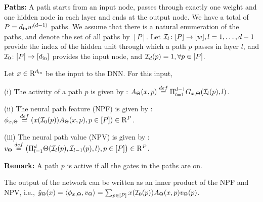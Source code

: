 \documentclass{article}
\begin{document}
\textbf{Paths:} A path starts from an input node, passes through exactly one weight and one hidden node in each layer and ends at the output node. We have a total of $P=d_{\text{in}} w^{(d-1)}$ paths. We assume that there is a natural enumeration of the paths, and denote the set of all paths by $[P]$. Let $\mathcal{I}_{l}\colon [P]\rightarrow [w],l=1,\ldots,d-1$ provide the index of the hidden unit through which a path $p$ passes in layer $l$, and $\mathcal{I}_{0}\colon [P]\rightarrow [d_{\text{in}}]$ provides the input node, and $\mathcal{I}_{d}(p)=1,\forall p\in[P]$.
\begin{definition}\label{def:nps} Let $x\in\mathrm{R}^{d_{\text{in}}}$ be the input to the DNN. For this input, 

(i) The activity of a path $p$ is given by : $A_{\Theta}(x,p)\stackrel{def}{=}\Pi_{l=1}^{d-1} G_{x,\Theta}(\mathcal{I}_l(p),l)$.

(ii) The {neural path feature} (NPF) is given by :  $\phi_{x,\Theta}\stackrel{def}=\left(x(\mathcal{I}_0(p))A_{\Theta}(x,p) ,p\in[P]\right)\in\mathrm{R}^P$. 

(iii) The {neural path value} (NPV) is given by : $v_{\Theta}\stackrel{def}=\left(\Pi_{l=1}^d \Theta(\mathcal{I}_l(p),\mathcal{I}_{l-1}(p),l),p\in[P]\right)\in\mathrm{R}^P$.
\end{definition}
\textbf{Remark:} A path $p$ is active if all the gates in the paths are on.
\begin{proposition}\label{prop:zero}  The output of the network can be written as an inner product of the NPF and NPV, i.e., 
$\hat{y}_{\Theta}(x)=\langle \phi_{x,\Theta},v_{\Theta}\rangle=\sum_{p\in [P]}x(\mathcal{I}_0(p))A_{\Theta}(x,p)v_{\Theta}(p)$.
\end{proposition}
\end{document}
